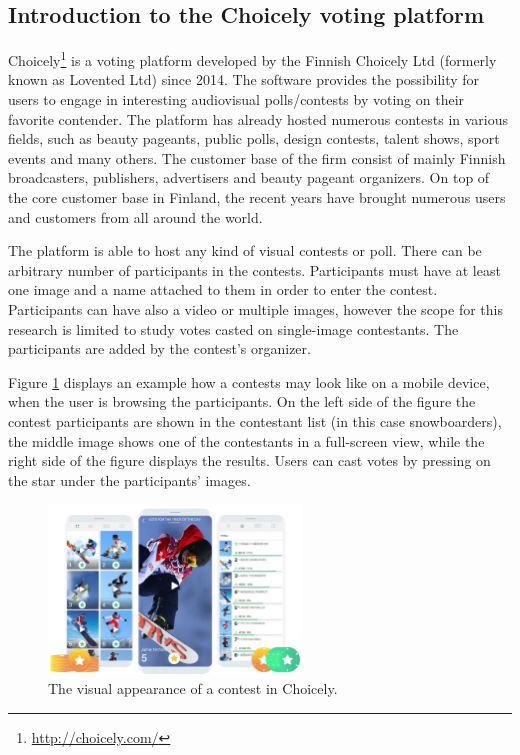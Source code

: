 \subsection{Introduction to the Choicely voting platform}
\label{section::introduction-to-the-choicely-voting-platform}
    Choicely\footnote{\url{http://choicely.com/}} is a voting platform developed by the Finnish Choicely Ltd (formerly known as Lovented Ltd) since 2014. The software provides the possibility for users to engage in interesting audiovisual polls/contests by voting on their favorite contender. The platform has already hosted numerous contests in various fields, such as beauty pageants, public polls, design contests, talent shows, sport events and many others. The customer base of the firm consist of mainly Finnish broadcasters, publishers, advertisers and beauty pageant organizers. On top of the core customer base in Finland, the recent years have brought numerous users and customers from all around the world. 
    
    The platform is able to host any kind of visual contests or poll. There can be arbitrary number of participants in the contests. Participants must have at least one image and a name attached to them in order to enter the contest. Participants can have also a video or multiple images, however the scope for this research is limited to study votes casted on single-image contestants. The participants are added by the contest's organizer. 
    
    Figure \ref{vote_trick_of_the_day} displays an example how a contests may look like on a mobile device, when the user is browsing the participants. On the left side of the figure the contest participants are shown in the contestant list (in this case snowboarders), the middle image shows one of the contestants in a full-screen view, while the right side of the figure displays the results. Users can cast votes by pressing on the star under the participants' images. 

    \begin{figure}[h] 
        \begin{center}
            \includegraphics[width=0.6\textwidth]{images/vote_trick_of_the_day.png}
            \caption{The visual appearance of a contest in Choicely.}
            \label{vote_trick_of_the_day}
        \end{center}
    \end{figure}


